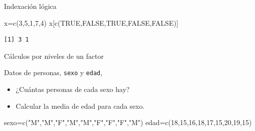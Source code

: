 \documentclass[
  ignorenonframetext,
  aspectratio=169,
  spanish,
]{beamer}
\newenvironment{Shaded}{\begin{snugshade}}{\end{snugshade}}
\newcommand{\ConstantTok}[1]{\textcolor[rgb]{0.56,0.35,0.01}{#1}}
\newcommand{\DecValTok}[1]{\textcolor[rgb]{0.68,0.00,0.00}{#1}}
\newcommand{\FunctionTok}[1]{\textcolor[rgb]{0.28,0.35,0.67}{#1}}
\newcommand{\NormalTok}[1]{\textcolor[rgb]{0.00,0.23,0.31}{#1}}
\newcommand{\OtherTok}[1]{\textcolor[rgb]{0.00,0.23,0.31}{#1}}
\newcommand{\StringTok}[1]{\textcolor[rgb]{0.13,0.47,0.30}{#1}}
\providecommand{\tightlist}{%
  \setlength{\itemsep}{0pt}\setlength{\parskip}{0pt}}
\begin{document}
\begin{frame}[fragile]{Indexación lógica}
\label{indexaciuxf3n-luxf3gica-1}
\begin{Shaded}
\begin{Highlighting}[]
\NormalTok{x}\OtherTok{=}\FunctionTok{c}\NormalTok{(}\DecValTok{3}\NormalTok{,}\DecValTok{5}\NormalTok{,}\DecValTok{1}\NormalTok{,}\DecValTok{7}\NormalTok{,}\DecValTok{4}\NormalTok{)}
\NormalTok{x[}\FunctionTok{c}\NormalTok{(}\ConstantTok{TRUE}\NormalTok{,}\ConstantTok{FALSE}\NormalTok{,}\ConstantTok{TRUE}\NormalTok{,}\ConstantTok{FALSE}\NormalTok{,}\ConstantTok{FALSE}\NormalTok{)]}
\end{Highlighting}
\end{Shaded}

\begin{verbatim}
[1] 3 1
\end{verbatim}
\end{frame}

\begin{frame}[fragile]{Cálculos por niveles de un factor}
\label{cuxe1lculos-por-niveles-de-un-factor}
\begin{tcolorbox}[enhanced jigsaw, leftrule=.75mm, left=2mm, colback=white, toptitle=1mm, bottomrule=.15mm, arc=.35mm, breakable, title=\textcolor{quarto-callout-important-color}{\faExclamation}\hspace{0.5em}{Importante}, coltitle=black, colbacktitle=quarto-callout-important-color!10!white, bottomtitle=1mm, opacityback=0, rightrule=.15mm, toprule=.15mm, colframe=quarto-callout-important-color-frame, opacitybacktitle=0.6, titlerule=0mm]

Datos de personas, \texttt{sexo} y \texttt{edad},

\begin{itemize}
\tightlist
\item
  ¿Cuántas personas de cada sexo hay?
\item
  Calcular la media de edad para cada sexo.
\end{itemize}

\end{tcolorbox}

\begin{Shaded}
\begin{Highlighting}[]
\NormalTok{sexo}\OtherTok{=}\FunctionTok{c}\NormalTok{(}\StringTok{"M"}\NormalTok{,}\StringTok{"M"}\NormalTok{,}\StringTok{"F"}\NormalTok{,}\StringTok{"M"}\NormalTok{,}\StringTok{"M"}\NormalTok{,}\StringTok{"F"}\NormalTok{,}\StringTok{"F"}\NormalTok{,}\StringTok{"F"}\NormalTok{,}\StringTok{"M"}\NormalTok{) }
\NormalTok{edad}\OtherTok{=}\FunctionTok{c}\NormalTok{(}\DecValTok{18}\NormalTok{,}\DecValTok{15}\NormalTok{,}\DecValTok{16}\NormalTok{,}\DecValTok{18}\NormalTok{,}\DecValTok{17}\NormalTok{,}\DecValTok{15}\NormalTok{,}\DecValTok{20}\NormalTok{,}\DecValTok{19}\NormalTok{,}\DecValTok{15}\NormalTok{) }
\end{Highlighting}
\end{Shaded}
\end{frame}
\end{document}
